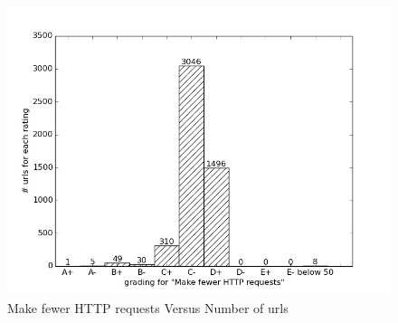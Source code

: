 \documentclass[conference]{IEEEtran}
\begin{document}
\begin{figure}[ht]
 \centering
  \includegraphics[scale=0.33]{new-img-jpg/vlab-jpg/Make fewer HTTP requests.jpg}
\caption{Make fewer HTTP requests Versus Number of urls}	
\label{fig:httpr}
\end{figure}
\end{document}
